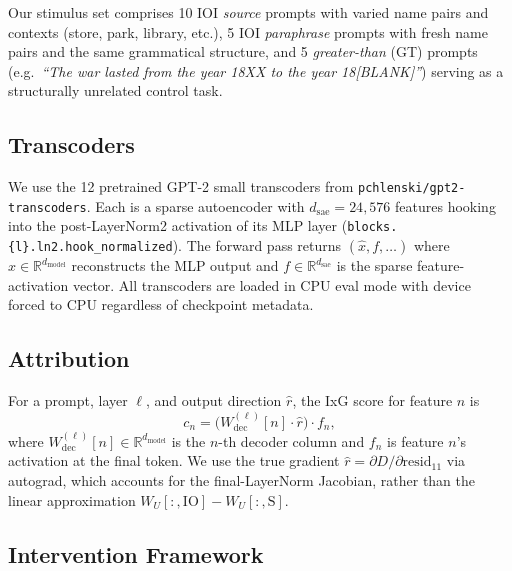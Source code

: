 \documentclass{article}
\begin{document}
Our stimulus set comprises 10 IOI \emph{source} prompts with varied name pairs
and contexts (store, park, library, etc.), 5 IOI \emph{paraphrase} prompts with
fresh name pairs and the same grammatical structure, and 5 \emph{greater-than}
(GT) prompts (e.g.\ \emph{``The war lasted from the year 18XX to the year
18[BLANK]''}) serving as a structurally unrelated control task.

\subsection{Transcoders}

We use the 12 pretrained GPT-2 small transcoders from
\texttt{pchlenski/gpt2-transcoders}. Each is a sparse autoencoder with
$d_\text{sae} = 24{,}576$ features hooking into the post-LayerNorm2 activation
of its MLP layer (\texttt{blocks.\{l\}.ln2.hook\_normalized}). The forward pass
returns $(\hat{x}, f, \ldots)$ where $\hat{x} \in \mathbb{R}^{d_\text{model}}$
reconstructs the MLP output and $f \in \mathbb{R}^{d_\text{sae}}$ is the sparse
feature-activation vector. All transcoders are loaded in CPU eval mode with
device forced to CPU regardless of checkpoint metadata.

\subsection{Attribution}

For a prompt, layer $\ell$, and output direction $\hat{r}$, the IxG score for
feature $n$ is
\begin{equation}
  c_n = \bigl(W_\text{dec}^{(\ell)}[n] \cdot \hat{r}\bigr) \cdot f_n,
  \label{eq:ixg}
\end{equation}
where $W_\text{dec}^{(\ell)}[n] \in \mathbb{R}^{d_\text{model}}$ is the $n$-th
decoder column and $f_n$ is feature $n$'s activation at the final token. We use
the true gradient $\hat{r} = \partial D / \partial \text{resid}_{11}$ via
autograd, which accounts for the final-LayerNorm Jacobian, rather than the
linear approximation $W_U[:, \text{IO}] - W_U[:, \text{S}]$.

\subsection{Intervention Framework}
\end{document}
